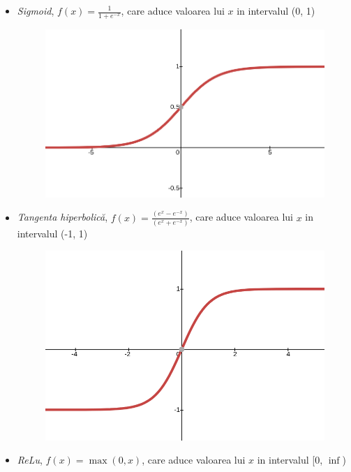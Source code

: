 \documentclass[a4paper,12pt]{book}
\begin{document}
			\begin{itemize}
				\item \textit{Sigmoid},  $f(x) = \frac{1}{1+e^{-x}}$, care aduce valoarea lui $x$ in intervalul (0, 1)
				\begin{figure}[h]
					\centering
					\includegraphics[scale=0.20]{sigmoid}
					\label{fig:sigmoid}
				\end{figure}
				\newline	
				\item \textit{Tangenta hiperbolică},  $f(x) = \frac{(e^x-e^{-x})}{(e^x+e^{-x})}$, care aduce valoarea lui $x$ in intervalul (-1, 1)
				\begin{figure}[!h]
					\centering
					\includegraphics[scale=0.20]{tanh}
					\label{fig:tanh}
				\end{figure}	
				\item \textit{ReLu}, $f(x) = \max(0, x)$, care aduce valoarea lui $x$ in intervalul  [0, $\inf$)
				\begin{figure}[!h]

\end{figure}
\end{itemize}
\end{document}
